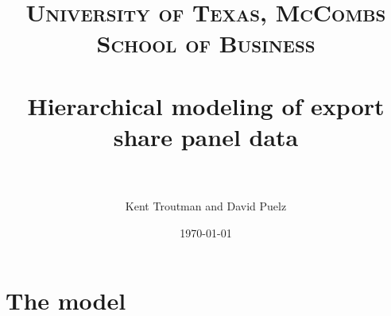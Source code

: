 \documentclass[paper=a4, fontsize=11pt]{scrartcl} %
\title{	
\normalfont \normalsize 
\textsc{University of Texas, McCombs School of Business} \\ [25pt] %
\horrule{0.1pt} \\[.5cm] %
\Large Hierarchical modeling of export share panel data \\ %
\horrule{.1pt} \\[0cm] %
}
\subtitle{}
\author{\large Kent Troutman and David Puelz} %
\date{\normalsize\today} %
\numberwithin{equation}{section} %
\numberwithin{figure}{section} %
\numberwithin{table}{section} %
\begin{document}
\maketitle
\tableofcontents
\newpage



\section{The model}

 
\end{document}
